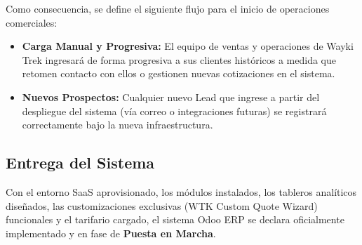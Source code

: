 Como consecuencia, se define el siguiente flujo para el inicio de operaciones comerciales:
\begin{itemize}[leftmargin=*]
    \item \textbf{Carga Manual y Progresiva:} El equipo de ventas y operaciones de Wayki Trek ingresará de forma progresiva a sus clientes históricos a medida que retomen contacto con ellos o gestionen nuevas cotizaciones en el sistema.
    \item \textbf{Nuevos Prospectos:} Cualquier nuevo Lead que ingrese a partir del despliegue del sistema (vía correo o integraciones futuras) se registrará correctamente bajo la nueva infraestructura.
\end{itemize}

\subsection{Entrega del Sistema}
Con el entorno SaaS aprovisionado, los módulos instalados, los tableros analíticos diseñados, las customizaciones exclusivas (WTK Custom Quote Wizard) funcionales y el tarifario cargado, el sistema Odoo ERP se declara oficialmente implementado y en fase de \textbf{Puesta en Marcha}.